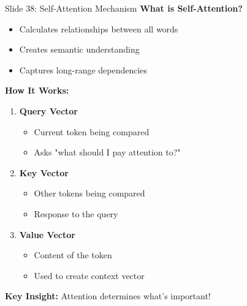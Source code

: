 \documentclass[8pt]{beamer}
\begin{document}
	\begin{frame}{Slide 38: Self-Attention Mechanism}
		\fontsize{6.5}{7.5}\selectfont
		\textbf{What is Self-Attention?}
		\begin{itemize}
			\item Calculates relationships between all words
			\item Creates semantic understanding
			\item Captures long-range dependencies
		\end{itemize}
		
		\vspace{0.1cm}
		\textbf{How It Works:}
		\begin{enumerate}
			\item \textbf{Query Vector}
			\begin{itemize}
				\item Current token being compared
				\item Asks "what should I pay attention to?"
			\end{itemize}
			\item \textbf{Key Vector}
			\begin{itemize}
				\item Other tokens being compared
				\item Response to the query
			\end{itemize}
			\item \textbf{Value Vector}
			\begin{itemize}
				\item Content of the token
				\item Used to create context vector
			\end{itemize}
		\end{enumerate}
		
		\textcolor{myblue}{\textbf{Key Insight:}} Attention determines what's important!
	\end{frame}
	
\end{document}
